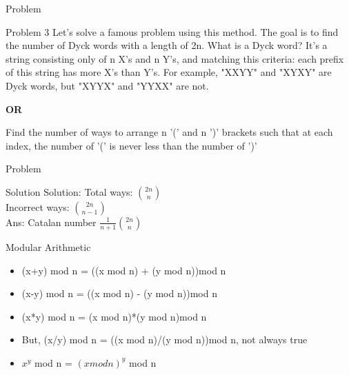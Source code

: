\documentclass{beamer}
\begin{document}
\begin{frame}[<+->]{Problem}
  \begin{block}{Problem 3}
    Let's solve a famous problem using this method. The goal is to find the number of Dyck words with a length of 2n. What is a Dyck word? It's a string consisting only of n X's and n Y's, and matching this criteria: each prefix of this string has more X's than Y's. For example, "XXYY" and "XYXY" are Dyck words, but "XYYX" and "YYXX" are not.\\
    \begin{center}{\bf OR}\end{center}
    Find the number of ways to arrange n '(' and n ')' brackets such that at each index, the number of '(' is never less than the number of ')'
  \end{block}
\end{frame}

\begin{frame}[<+->]{Problem}
  \begin{block}{Solution}
    Solution: Total ways: ${2n \choose n}$\\
    \hspace{10mm} Incorrect ways: ${2n \choose n-1}$\\
    Ans: Catalan number $\frac{1}{n+1}{2n \choose n}$
  \end{block}
\end{frame}

\begin{frame}[<+->]{Modular Arithmetic}
  \begin{block}{}
    \begin{itemize}
      \item (x+y) mod n = ((x mod n) + (y mod n))mod n
      \item (x-y) mod n = ((x mod n) - (y mod n))mod n
      \item (x*y) mod n = (x mod n)*(y mod n)mod n
      \item \alert{But, (x/y) mod n = ((x mod n)/(y mod n))mod n, not always true}
      \item $x^y$ mod n = ${(x mod n)}^y$ mod n
    \end{itemize}
  \end{block}
\end{frame}
\end{document}
